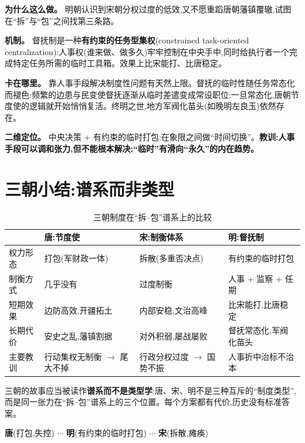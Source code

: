 \documentclass[UTF8,12pt,a4paper]{ctexrep}
\begin{document}
\textbf{为什么这么做。} 明朝认识到宋朝分权过度的低效,又不愿重蹈唐朝藩镇覆辙,试图在``拆''与``包''之间找第三条路。

\textbf{机制。} 督抚制是一种\textbf{有约束的任务型集权}(constrained task-oriented centralization):人事权(谁来做、做多久)牢牢控制在中央手中,同时给执行者一个完成特定任务所需的临时工具箱。效果上比宋能打、比唐稳定。

\textbf{卡在哪里。} 靠人事手段解决制度性问题有天然上限。督抚的临时性随任务常态化而褪色:频繁的边患与民变使督抚逐渐从临时差遣变成常设职位;一旦常态化,唐朝节度使的逻辑就开始悄悄复活。终明之世,地方军阀化苗头(如晚明左良玉)依然存在。

\textbf{二维定位。} 中央决策 + 有约束的临时打包:在象限之间做``时间切换''。\textbf{教训:人事手段可以调和张力,但不能根本解决;``临时''有滑向``永久''的内在趋势。}

\section{三朝小结:谱系而非类型}

\begin{table}[htbp]
  \centering
  \small
  \caption{三朝制度在``拆--包''谱系上的比较}
  \label{tab:compare3}
  \begin{tabularx}{\linewidth}{@{}lXXX@{}}
    \toprule
    & \textbf{唐:节度使} & \textbf{宋:制衡体系} & \textbf{明:督抚制} \\
    \midrule
    权力形态 & 打包(军财政一体) & 拆散(多重否决点) & 有约束的临时打包 \\
    制衡方式 & 几乎没有 & 过度制衡 & 人事 + 监察 + 任期 \\
    短期效果 & 边防高效,开疆拓土 & 内部安稳,文治高峰 & 比宋能打,比唐稳定 \\
    长期代价 & 安史之乱,藩镇割据 & 对外积弱,屡战屡败 & 督抚常态化,军阀化苗头 \\
    主要教训 & 行动集权无制衡 $\rightarrow$ 尾大不掉 & 行政分权过度 $\rightarrow$ 国势不振 & 人事折中治标不治本 \\
    \bottomrule
  \end{tabularx}
\end{table}

三朝的故事应当被读作\textbf{谱系而不是类型学}:唐、宋、明不是三种互斥的``制度类型'',而是同一张力在``拆--包''谱系上的三个位置。每个方案都有代价,历史没有标准答案。

\begin{center}
  \small
  \textbf{唐}(打包,失控) $\cdots$ \textbf{明}(有约束的临时打包) $\cdots$ \textbf{宋}(拆散,瘫痪)
\end{center}
\end{document}
